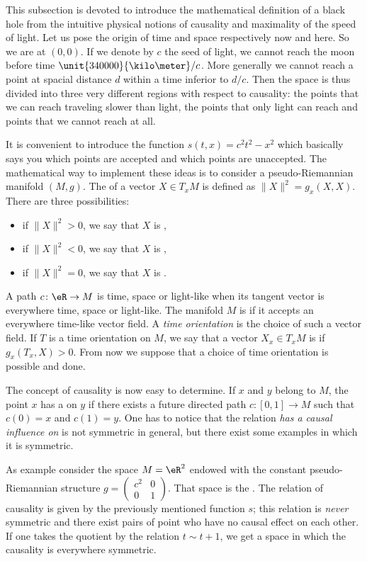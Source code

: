 This subsection is devoted to introduce the mathematical definition of a black hole from the intuitive physical notions of causality and maximality of the speed of light. Let us pose the origin of time and space respectively now and here. So we are at $(0,0)$. If we denote by $c$ the seed of light, we cannot reach the moon before time $\unit{340000}{\kilo\meter}/c$. More generally we cannot reach a point at spacial distance $d$ within a time inferior to $d/c$. Then the space is thus divided into three very different regions with respect to causality: the points that we can reach traveling slower than light, the points that only light can reach and points that we cannot reach at all.

It is convenient to introduce the function $s(t,x)=c^2t^2-x^2$ which basically says you which points are accepted and which points are unaccepted. The mathematical way to implement these ideas is to consider a pseudo-Riemannian manifold $(M,g)$. The  of a vector $X\in T_xM$ is defined as $\| X \|^2=g_x(X,X)$. There are three possibilities:
\begin{itemize}\label{PgDefsGenre}
	\item if $\| X \|^2>0$, we say that $X$ is ,
	\item if $\| X \|^2<0$, we say that $X$ is ,
	\item if $\| X \|^2=0$, we say that $X$ is .
\end{itemize}
A path $c\colon \eR\to M$ is time, space or light-like when its tangent vector is everywhere time, space or light-like. The manifold $M$ is  if it accepts an everywhere time-like vector field. A \emph{time orientation} is the choice of such a vector field. If $T$ is a time orientation on $M$, we say that a vector $X_x\in T_xM$ is  if $g_x(T_x,X)>0$. From now we suppose that a choice of time orientation is possible and done.

The concept of causality is now easy to determine. If $x$ and $y$ belong to $M$, the point $x$ has a  on $y$ if there exists a future directed path $c\colon [0,1]\to M$ such that $c(0)=x$ and $c(1)=y$. One has to notice that the relation \emph{has a causal influence on} is not symmetric in general, but there exist some examples in which it is symmetric.

As example consider the space $M=\eR^2$ endowed with the constant pseudo-Riemannian structure $g=\begin{pmatrix}c^2&0\\0&1 \end{pmatrix}$. That space is the . The relation of causality is given by the previously mentioned function $s$; this relation is \emph{never} symmetric and there exist pairs of point who have no causal effect on each other. If one takes the quotient by the relation $t\sim t+1$, we get a space in which the causality is everywhere symmetric.

